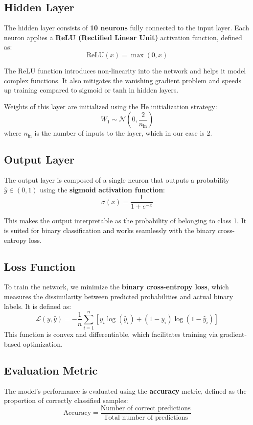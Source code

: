 \documentclass[12pt]{article}
\begin{document}
\subsection{Hidden Layer}

The hidden layer consists of \textbf{10 neurons} fully connected to the input layer. Each neuron applies a \textbf{ReLU (Rectified Linear Unit)} activation function, defined as:
\[
\text{ReLU}(x) = \max(0, x)
\]

The ReLU function introduces non-linearity into the network and helps it model complex functions. It also mitigates the vanishing gradient problem and speeds up training compared to sigmoid or tanh in hidden layers.

Weights of this layer are initialized using the He initialization strategy:
\[
W_1 \sim \mathcal{N}(0, \frac{2}{n_{\text{in}}})
\]
where $n_{\text{in}}$ is the number of inputs to the layer, which in our case is 2.

\subsection{Output Layer}

The output layer is composed of a single neuron that outputs a probability $\hat{y} \in (0,1)$ using the \textbf{sigmoid activation function}:
\[
\sigma(x) = \frac{1}{1 + e^{-x}}
\]

This makes the output interpretable as the probability of belonging to class 1. It is suited for binary classification and works seamlessly with the binary cross-entropy loss.

\subsection{Loss Function}

To train the network, we minimize the \textbf{binary cross-entropy loss}, which measures the dissimilarity between predicted probabilities and actual binary labels. It is defined as:
\[
\mathcal{L}(y, \hat{y}) = - \frac{1}{n} \sum_{i=1}^{n} \left[ y_i \log(\hat{y}_i) + (1 - y_i) \log(1 - \hat{y}_i) \right]
\]
This function is convex and differentiable, which facilitates training via gradient-based optimization.

\subsection{Evaluation Metric}

The model's performance is evaluated using the \textbf{accuracy} metric, defined as the proportion of correctly classified samples:
\[
\text{Accuracy} = \frac{\text{Number of correct predictions}}{\text{Total number of predictions}}
\]
\end{document}
